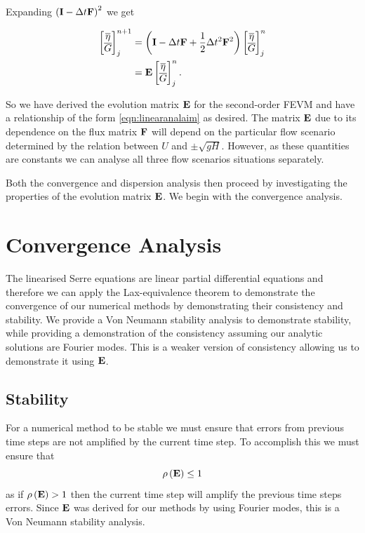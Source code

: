 Expanding $\left(\mathbf{I} - \Delta t\mathbf{F} \right)^2$ we get

\begin{align}
\begin{bmatrix}
\overline{\eta} \\ \overline{G}
\end{bmatrix}^{n+1}_j &= \left(\mathbf{I}  -\Delta t\mathbf{F} + \frac{1}{2}\Delta t^2\mathbf{F}^2 \right) \begin{bmatrix}
\overline{\eta} \\ \overline{G}
\end{bmatrix}^{n}_j \nonumber\\ &=  \mathbf{E}\begin{bmatrix}
\overline{\eta} \\ \overline{G}
\end{bmatrix}^{n}_j.
\label{eqn:evolutionmatrix}
\end{align}

So we have derived the evolution matrix $\mathbf{E}$ for the second-order FEVM and have a relationship of the form \eqref{eqn:linearanalaim} as desired. The matrix $\mathbf{E}$ due to its dependence on the flux matrix $\mathbf{F}$ will depend on the particular flow scenario determined by the relation between $U$ and $\pm\sqrt{gH}$. However, as these quantities are constants we can analyse all three flow scenarios situations separately. 

Both the convergence and dispersion analysis then proceed by investigating the properties of the evolution matrix $\mathbf{E}$. We begin with the convergence analysis.

\section{Convergence Analysis}
The linearised Serre equations are linear partial differential equations and therefore we can apply the Lax-equivalence theorem to demonstrate the convergence of our numerical methods by demonstrating their consistency and stability. We provide a Von Neumann stability analysis to demonstrate stability, while providing a demonstration of the consistency assuming our analytic solutions are Fourier modes. This is a weaker version of consistency allowing us to demonstrate it using $\mathbf{E}$.

\subsection{Stability}
For a numerical method to be stable we must ensure that errors from previous time steps are not amplified by the current time step. To accomplish this we must ensure that
\begin{equation}
\rho\left(\mathbf{E} \right) \le 1
\label{eqn:stabilitycondition}
\end{equation}
as if $\rho\left(\mathbf{E} \right) > 1$ then the current time step will amplify the previous time steps errors. Since $\mathbf{E}$ was derived for our methods by using Fourier modes, this is a Von Neumann stability analysis. 


